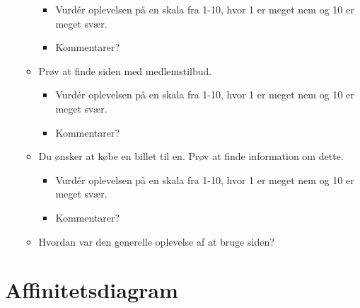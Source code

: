 \begin{appendices}
\begin{itemize}
\begin{itemize}
        \begin{itemize}
            \item Vurdér oplevelsen på en skala fra 1-10, hvor 1 er meget nem og 10 er meget svær.
            \item Kommentarer?
        \end{itemize}
        \item Prøv at finde siden med medlemstilbud.
        \begin{itemize}
            \item Vurdér oplevelsen på en skala fra 1-10, hvor 1 er meget nem og 10 er meget svær.
            \item Kommentarer?
        \end{itemize}
        \item Du ønsker at købe en billet til en. Prøv at finde information om dette.
        \begin{itemize}
            \item Vurdér oplevelsen på en skala fra 1-10, hvor 1 er meget nem og 10 er meget svær.
            \item Kommentarer?
        \end{itemize}
        \item Hvordan var den generelle oplevelse af at bruge siden?
    \end{itemize}
\end{itemize}
    \section{Affinitetsdiagram}
    \label{b:aff}
    


\end{appendices}
